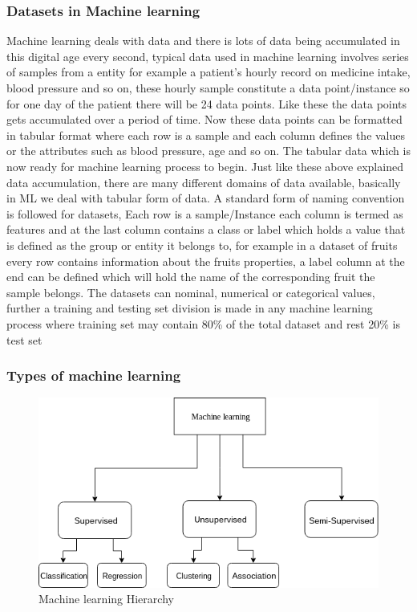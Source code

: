\subsubsection{Datasets in Machine learning}
Machine learning deals with data and there is lots of data being accumulated in this digital age every second, typical data used in machine learning involves series of samples from a entity for example a patient's hourly record on medicine intake, blood pressure and so on, these hourly sample constitute a data point/instance so for one day of the patient there will be 24 data points. Like these the data points gets accumulated over a period of time. Now these data points can be formatted in tabular format where each row is a sample and each column defines the values or the attributes such as blood pressure, age and so on. The tabular data which is now ready for machine learning process to begin. Just like these above explained data accumulation, there are many different domains of data available, basically in ML we deal with tabular form of data. A standard form of naming convention is followed for datasets, Each row is a sample/Instance each column is termed as features and at the last column contains a class or label which holds a value that is defined as the group or entity it belongs to, for example in a dataset of fruits every row contains information about the fruits properties, a label column at the end can be defined which will hold the name of the corresponding fruit the sample belongs. The datasets can nominal, numerical or categorical values,  further a training and testing set division is made in any machine learning process where training set may contain 80\% of the total dataset and rest 20\% is test set

\subsubsection{Types of machine learning}

\begin{figure}[!h]
    	\centering
    	\includegraphics[width=0.9\linewidth]{thesis_template/images/machine_learning.png}
    	\caption{Machine learning Hierarchy}
    	\label{fig:machine_learning}
    \end{figure}
    
